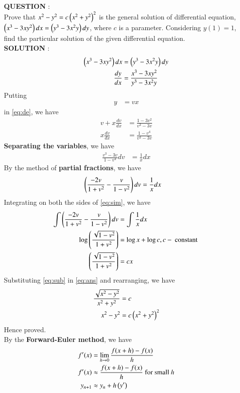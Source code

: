\documentclass[journal]{IEEEtran}
\begin{document}
\textbf{QUESTION} : \\
Prove that $x^2 - y^2 = c\left(x^2 + y^2\right)^2$ is the general solution of differential equation, $\left(x^3 - 3xy^2\right) dx = \left(y^3 - 3x^2y\right) dy$, where $c$ is a parameter. Considering $y(1) = 1$, find the particular solution of the given differential equation.\\
\textbf{SOLUTION} : \\
\begin{align}
	\left(x^3 - 3xy^2\right) dx &= \left(y^3 - 3x^2y\right) dy \\
	\frac{dy}{dx} &= \frac{x^3 - 3xy^2}{y^3 - 3x^2y} \label{eq:de} 
\end{align}
Putting 
\begin{align}
	y &= vx \label{eq:sub}
\end{align}
in \eqref{eq:de}, we have
\begin{align}
	v + x \frac{dv}{dx} &= \frac{1 - 3v^2}{v^3 - 3v} \\
	x \frac{dv}{dx} &= \frac{1 - v^4}{v^3 - 3v}
\end{align}
\textbf{Separating the variables}, we have
\begin{align}
	\frac{v^3 - 3v}{1 - v^4} dv &= \frac{1}{x} dx 
\end{align}
By the method of \textbf{partial fractions}, we have
\begin{align}
	\left(\frac{-2v}{1 + v^2} - \frac{v}{1 - v^2}\right) dv &= \frac{1}{x} dx \label{eq:sim}
\end{align}
Integrating on both the sides of \eqref{eq:sim}, we have
\begin{align}
	\int \left(\frac{-2v}{1 + v^2} - \frac{v}{1 - v^2}\right) dv &= \int \frac{1}{x} dx \\
	\log \left(\frac{\sqrt{1 - v^2}}{1 + v^2}\right) &= \log{x} + \log{c},  c - \text{ constant } \\
	\left(\frac{\sqrt{1 - v^2}}{1 + v^2}\right) &= cx \label{eq:ans}
\end{align}
Substituting \eqref{eq:sub} in \eqref{eq:ans} and rearranging, we have
\begin{align}
	\frac{\sqrt{x^2 - y^2}}{x^2 + y^2} &= c \\
	x^2 - y^2 &= c \left(x^2 + y^2\right)^2
\end{align}
Hence proved. \\
By the \textbf{Forward-Euler method}, we have \\
\begin{align}
	f^{\prime} (x) &= \lim_{h \to 0} \frac{f(x+h) - f(x)}{h} \\
	f^{\prime} (x) &\approx \frac{f(x+h) - f(x)}{h} \text{ for small } h\\
	y_{n+1} &\approx y_{n} + h \left(y^{\prime}\right) \label{eq:dif}
\end{align}
\end{document}
